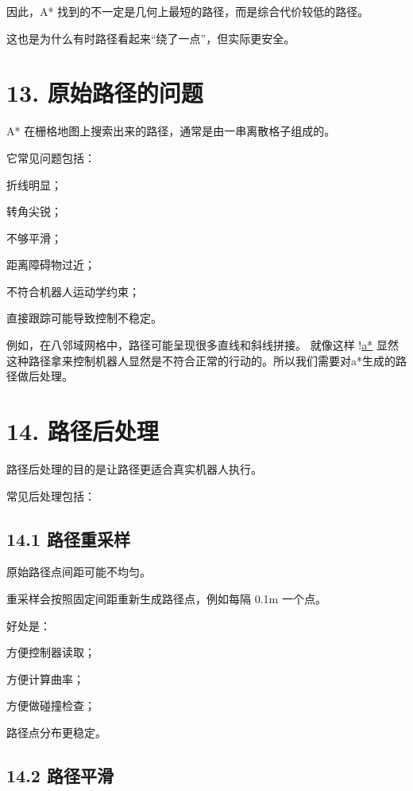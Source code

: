\documentclass[a4paper,12pt]{book}
\begin{document}
{因此，A* 找到的不一定是几何上最短的路径，而是综合代价较低的路径。

这也是为什么有时路径看起来“绕了一点”，但实际更安全。

\hrulefill

\section{13. 原始路径的问题}

A* 在栅格地图上搜索出来的路径，通常是由一串离散格子组成的。

它常见问题包括：

\item 折线明显；
\item 转角尖锐；
\item 不够平滑；
\item 距离障碍物过近；
\item 不符合机器人运动学约束；
\item 直接跟踪可能导致控制不稳定。

例如，在八邻域网格中，路径可能呈现很多直线和斜线拼接。
就像这样
!\href{picture/astar.png}{a*}
显然这种路径拿来控制机器人显然是不符合正常的行动的。所以我们需要对a*生成的路径做后处理。



\section{14. 路径后处理}

路径后处理的目的是让路径更适合真实机器人执行。

常见后处理包括：

\subsection{14.1 路径重采样}

原始路径点间距可能不均匀。

重采样会按照固定间距重新生成路径点，例如每隔 0.1m 一个点。

好处是：

\item 方便控制器读取；
\item 方便计算曲率；
\item 方便做碰撞检查；
\item 路径点分布更稳定。

\subsection{14.2 路径平滑}

}
\end{document}

